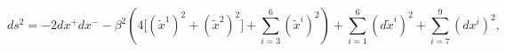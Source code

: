 \begin{equation}
\label{metn3pp}
ds^2 = - 2dx^+ dx^- - \beta^2 \left( 
4 \Big[ (\tilde{x}^1)^2 + (\tilde{x}^2)^2 \Big]
+ \sum_{i=3}^6 (\tilde{x}^i)^2 \right)
+ \sum_{i=1}^6 (d\tilde{x}^i)^2 + \sum_{i=7}^9 (dx^i)^2,
\end{equation}

